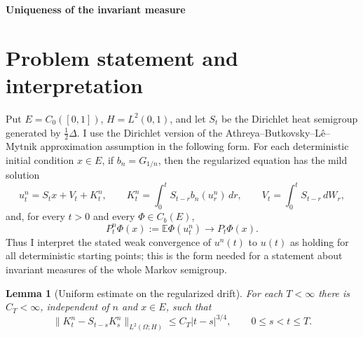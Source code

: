 \documentclass[12pt]{article}
\newtheorem{lemma}{Lemma}
\newcommand{\E}{\mathbb E}
\newcommand{\1}{\mathbf 1}
\begin{document}
\begin{center}
{\bf Uniqueness of the invariant measure}
\end{center}

\section*{Problem statement and interpretation}

Put \(E=C_0([0,1])\), \(H=L^2(0,1)\), and let \(S_t\) be the Dirichlet heat
semigroup generated by \(\frac12\Delta\).  I use the Dirichlet version of the
Athreya--Butkovsky--L\^e--Mytnik approximation assumption in the following
form.  For each deterministic initial condition \(x\in E\), if \(b_n=G_{1/n}\),
then the regularized equation has the mild solution
\[
  u_t^n=S_t x+V_t+K_t^n,\qquad
  K_t^n=\int_0^tS_{t-r}b_n(u_r^n)\,dr,\qquad
  V_t=\int_0^tS_{t-r}\,dW_r ,
\]
and, for every \(t>0\) and every \(\Phi\in C_b(E)\),
\[
        P_t^n\Phi(x):=\E\Phi(u_t^n)\longrightarrow P_t\Phi(x).
        \tag{1}
\]
Thus I interpret the stated weak convergence of \(u^n(t)\) to \(u(t)\) as
holding for all deterministic starting points; this is the form needed for a
statement about invariant measures of the whole Markov semigroup.

\begin{lemma}[Uniform estimate on the regularized drift]\label{lem:Hestimate}
For each \(T<\infty\) there is \(C_T<\infty\), independent of \(n\) and
\(x\in E\), such that
\[
 \|K_t^n-S_{t-s}K_s^n\|_{L^2(\Omega;H)}
      \le C_T |t-s|^{3/4},\qquad 0\le s<t\le T .             \tag{2}
\]
\end{lemma}
\end{document}
